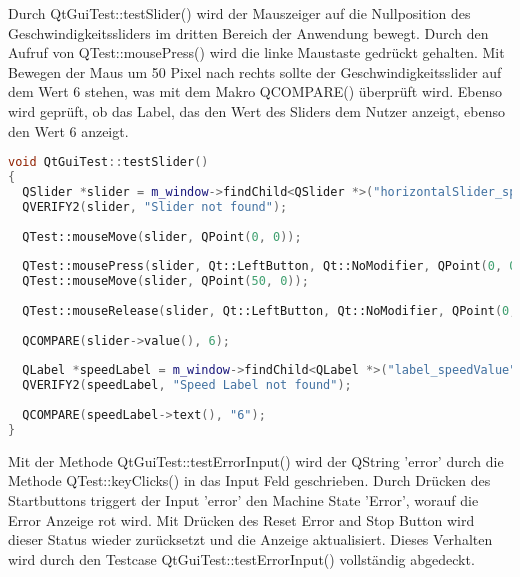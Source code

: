 		Durch QtGuiTest::testSlider() wird der Mauszeiger auf die Nullposition des Geschwindigkeitssliders im dritten Bereich der Anwendung bewegt. Durch den Aufruf von QTest::mousePress() wird die linke Maustaste gedrückt gehalten. Mit Bewegen der Maus um 50 Pixel nach rechts sollte der Geschwindigkeitsslider auf dem Wert 6 stehen, was mit dem Makro QCOMPARE() überprüft wird. Ebenso wird geprüft, ob das Label, das den Wert des Sliders dem Nutzer anzeigt, ebenso den Wert 6 anzeigt.
		\begin{lstlisting}[language=C++, caption=qtguitest.cpp]
void QtGuiTest::testSlider()
{
  QSlider *slider = m_window->findChild<QSlider *>("horizontalSlider_speed");
  QVERIFY2(slider, "Slider not found");
	
  QTest::mouseMove(slider, QPoint(0, 0));
	
  QTest::mousePress(slider, Qt::LeftButton, Qt::NoModifier, QPoint(0, 0));
  QTest::mouseMove(slider, QPoint(50, 0));
	
  QTest::mouseRelease(slider, Qt::LeftButton, Qt::NoModifier, QPoint(0, 0));
	
  QCOMPARE(slider->value(), 6);
	
  QLabel *speedLabel = m_window->findChild<QLabel *>("label_speedValue");
  QVERIFY2(speedLabel, "Speed Label not found");
	
  QCOMPARE(speedLabel->text(), "6");
}
		\end{lstlisting}
		Mit der Methode QtGuiTest::testErrorInput() wird der QString 'error' durch die Methode QTest::keyClicks() in das Input Feld geschrieben. Durch Drücken des Startbuttons triggert der Input 'error' den Machine State 'Error', worauf die Error Anzeige rot wird. Mit Drücken des Reset Error and Stop Button wird dieser Status wieder zurücksetzt und die Anzeige aktualisiert. Dieses Verhalten wird durch den Testcase QtGuiTest::testErrorInput() vollständig abgedeckt.
